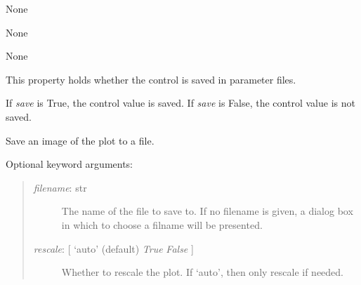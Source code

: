 \documentclass[letterpaper,10pt,english]{sphinxmanual}
\begin{document}
\begin{fulllineitems}

\begin{fulllineitems}
\label{api:controls.Plot2D.pick_action}
None

\end{fulllineitems}


\begin{fulllineitems}
\label{api:controls.Plot2D.pop_event}
None

\end{fulllineitems}


\begin{fulllineitems}
\label{api:controls.Plot2D.resize_action}
None

\end{fulllineitems}


\begin{fulllineitems}
\label{api:controls.Plot2D.save}
This property holds whether the control is saved in parameter files.

If \emph{save} is True, the control value is saved.
If \emph{save} is False, the control value is not saved.

\end{fulllineitems}


\begin{fulllineitems}
\label{api:controls.Plot2D.save_figure}
Save an image of the plot to a file.

Optional keyword arguments:
\begin{quote}
\begin{description}
\item[{\emph{filename}: str}] \leavevmode
The name of the file to save to. If no filename is given, a dialog
box in which to choose a filname will be presented.

\item[{\emph{rescale}: {[} `auto' (default) \textbar{} \emph{True} \textbar{} \emph{False} {]}}] \leavevmode
Whether to rescale the plot. If `auto', then only rescale if needed.


\end{description}
\end{quote}
\end{fulllineitems}
\end{fulllineitems}
\end{document}
